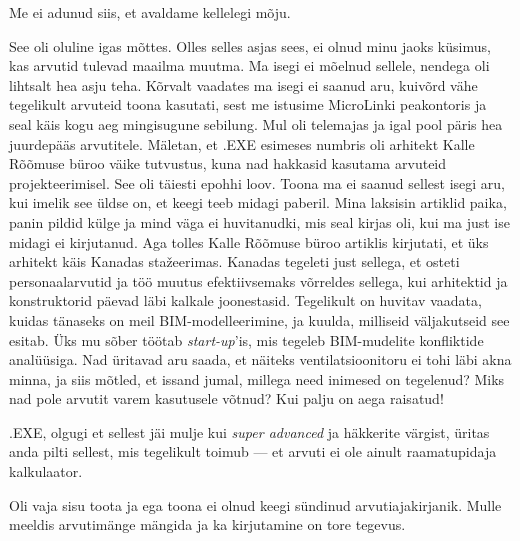 
Me ei adunud siis, et avaldame kellelegi mõju.


See oli oluline igas mõttes. Olles selles asjas sees, ei olnud minu jaoks
küsimus, kas arvutid tulevad maailma muutma. Ma isegi ei mõelnud sellele, 
nendega oli lihtsalt hea asju teha. Kõrvalt vaadates ma isegi ei saanud aru, 
kuivõrd 
vähe tegelikult arvuteid toona kasutati, sest me istusime MicroLinki 
peakontoris ja seal käis kogu aeg mingisugune sebilung. Mul oli telemajas ja 
igal pool päris hea 
juurdepääs arvutitele. 
Mäletan, et .EXE esimeses 
numbris oli arhitekt Kalle Rõõmuse büroo 
väike tutvustus, kuna nad hakkasid kasutama arvuteid 
projekteerimisel. See oli täiesti epohhi loov. Toona ma ei 
saanud sellest isegi aru, kui imelik see üldse on, et keegi teeb midagi 
paberil. Mina laksisin artiklid paika, panin pildid külge ja mind 
väga ei huvitanudki, mis seal kirjas oli, kui ma just ise midagi ei kirjutanud. 
Aga tolles Kalle Rõõmuse büroo artiklis kirjutati, et üks 
arhitekt käis Kanadas stažeerimas. Kanadas tegeleti just sellega, et osteti 
personaalarvutid ja töö muutus efektiivsemaks võrreldes sellega, kui arhitektid 
ja konstruktorid päevad läbi kalkale joonestasid.
Tegelikult on huvitav vaadata, kuidas tänaseks on meil 
BIM-modelleerimine, 
ja kuulda, milliseid väljakutseid see esitab. Üks mu sõber töötab 
\emph{start-up}'is, mis tegeleb BIM-mudelite konfliktide analüüsiga. Nad 
üritavad aru saada, 
et näiteks ventilatsioonitoru ei tohi läbi akna minna, ja siis mõtled, et 
issand jumal, millega need inimesed on tegelenud? Miks nad pole
arvutit varem kasutusele võtnud? Kui palju on aega raisatud!

.EXE, olgugi et sellest jäi mulje kui \emph{super 
advanced} ja häkkerite värgist, üritas anda pilti sellest, mis tegelikult 
toimub --- et arvuti ei ole ainult raamatupidaja kalkulaator. 


Oli vaja sisu toota ja ega toona ei olnud keegi sündinud
arvutiajakirjanik. Mulle meeldis arvutimänge mängida ja ka
kirjutamine on tore tegevus. 

